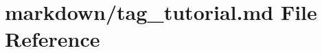 \hypertarget{tag__tutorial_8md}{}\section{markdown/tag\+\_\+tutorial.md File Reference}
\label{tag__tutorial_8md}

